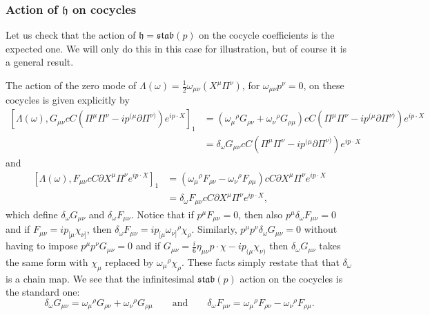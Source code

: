 \documentclass[11pt,reqno,a4paper,final]{amsart}
\theoremstyle{plain}
\theoremstyle{definition}
\newcommand{\h}{\mathfrak{h}}
\renewcommand{\d}{\partial}
\newcommand{\stab}{\mathfrak{stab}}
\newcommand{\1}{\mathbb{1}}
\numberwithin{equation}{section}
\begin{document}
\subsubsection{Action of $\h$ on cocycles}
\label{sec:action-h-2-cocycles}

Let us check that the action of $\h = \stab(p)$ on the cocycle coefficients
is the expected one.  We will only do this in this case for
illustration, but of course it is a general result.

The action of the zero mode of $\Lambda(\omega) = \frac12
\omega_{\mu\nu} (X^\mu \Pi^\nu)$, for $\omega_{\mu\nu} p^\nu = 0$,  on
these cocycles is given explicitly by
\begin{equation}
  \begin{split}
    [\Lambda(\omega), G_{\mu\nu} c C \left(\Pi^\mu \Pi^\nu - i p^{(\mu} \d \Pi^{\nu)}  \right) e^{i p \cdot X}]_1
    &= \left(\omega_\mu{}^\rho G_{\rho\nu} + \omega_\nu{}^\rho G_{\rho\mu}\right) c C \left(\Pi^\mu \Pi^\nu - i p^{(\mu} \d \Pi^{\nu)}  \right) e^{i p \cdot X}\\
    &= \delta_\omega G_{\mu\nu} c C \left(\Pi^\mu \Pi^\nu - i p^{(\mu} \d \Pi^{\nu)}  \right) e^{i p \cdot X}
  \end{split}
\end{equation}
and
\begin{equation}
  \begin{split}
    [\Lambda(\omega), F_{\mu\nu} c C \d X^\mu \Pi^\nu e^{i p \cdot X}]_1
    &= (\omega_\mu{}^\rho F_{\rho\nu} - \omega_\nu{}^\rho F_{\rho\mu})  c C \d X^\mu \Pi^\nu e^{i p \cdot X}\\
    &= \delta_\omega F_{\mu\nu} c C \d X^\mu \Pi^\nu e^{i p \cdot X},
  \end{split}
\end{equation}
which define $\delta_\omega G_{\mu\nu}$ and
$\delta_\omega F_{\mu\nu}$.  Notice that if $p^\mu F_{\mu\nu}= 0$,
then also $p^\mu \delta_\omega F_{\mu\nu} = 0$ and if
$F_{\mu\nu} = i p_{[\mu} \chi_{\nu]}$, then
$\delta_\omega F_{\mu\nu} = i p_{[\mu} \omega_{\nu]}{}^\rho
\chi_\rho$.  Similarly, $p^\mu p^\nu \delta_\omega G_{\mu\nu} = 0$
without having to impose $p^\mu p^\nu G_{\mu\nu} = 0$ and if
$G_{\mu\nu} = \tfrac{i}6 \eta_{\mu\nu} p \cdot \chi - i p_{(\mu}
\chi_{\nu)}$ then $\delta_\omega G_{\mu\nu}$ takes the same form with
$\chi_\mu$ replaced by $\omega_\mu{}^\rho \chi_\rho$.  These facts
simply restate that that $\delta_\omega$ is a chain map.  We see that
the infinitesimal $\stab(p)$ action on the cocycles is the standard
one:
\begin{equation}
  \delta_\omega G_{\mu\nu} = \omega_\mu{}^\rho G_{\rho\nu} +
  \omega_\nu{}^\rho G_{\rho\mu} \qquad\text{and}\qquad \delta_\omega
  F_{\mu\nu} = \omega_\mu{}^\rho F_{\rho\nu} - \omega_\nu{}^\rho
  F_{\rho\mu}.
\end{equation}
\end{document}
